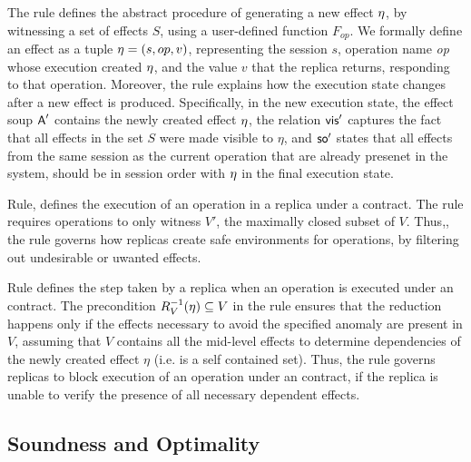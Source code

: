 The rule
 defines the abstract procedure of generating a new effect $\eta$, by witnessing a set
of effects $S$, using a user-defined function $F_{op}$. 
We formally define an effect as a tuple $\eta=(s,op,v)$, representing the
session $s$, operation name \emph{op} 
whose execution created $\eta$, and the value $v$
that the replica returns, responding to that operation.
%
Moreover, the rule explains how the execution state changes after a new
effect is produced. Specifically, in the new execution state, 
the effect soup
${\normalfont \textsf{A}}'$ contains the newly created effect $\eta$,
the relation ${\normalfont \textsf{vis}}'$
captures the fact that all effects in the set $S$ were made
visible to $\eta$, and ${\textsf{so}}'$ states that all effects from the same
session as the current operation that are
already presenet in the system, should be in session
order with $\eta$ in the final execution state.

Rule, defines the execution of an operation in a
replica under a \UB{} contract.  The rule requires operations to only
witness $V'$, the maximally closed subset of $V$.  Thus,, the rule
governs how replicas create safe environments for operations, by
filtering out undesirable or uwanted effects.

Rule  defines the step taken by a replica when an
operation is executed under an \LB{} contract. The precondition
$R_V^{-1}(\eta)\subseteq V$ in the rule ensures that the reduction
happens only if the effects necessary to avoid the specified anomaly
are present in $V$, assuming that $V$ contains all the mid-level
effects to determine dependencies of the newly created effect $\eta$
(i.e.  is a self contained set). Thus, the rule governs replicas to
block execution of an operation under an \LB{} contract, if the
replica is unable to verify the presence of all necessary dependent
effects.


\subsection{Soundness and Optimality}
\label{subsec:sound}



